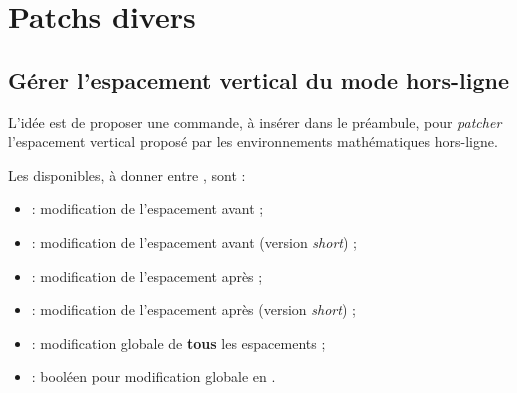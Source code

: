 \documentclass[french,11pt,a4paper]{article}
\begin{document}
\begin{DemoCode}{}
\end{DemoCode}

\begin{DemoCode}{}
\end{DemoCode}

\pagebreak

\section{Patchs divers}

\subsection{Gérer l'espacement vertical du mode hors-ligne}

L'idée est de proposer une commande, à insérer dans le préambule, pour \textit{patcher} l'espacement vertical proposé par les environnements mathématiques hors-ligne.


Les  disponibles, à donner entre \MontreCode{[...]}, sont :

\begin{itemize}
	\item {} : modification de l'espacement avant ;
	\item {} : modification de l'espacement avant (version \textit{short}) ;
	\item {} : modification de l'espacement après ;
	\item {} : modification de l'espacement après (version \textit{short}) ;
	\item {} : modification globale de \textbf{tous} les espacements ;
	\item {} : booléen pour modification globale en .
\end{itemize}
\end{document}
